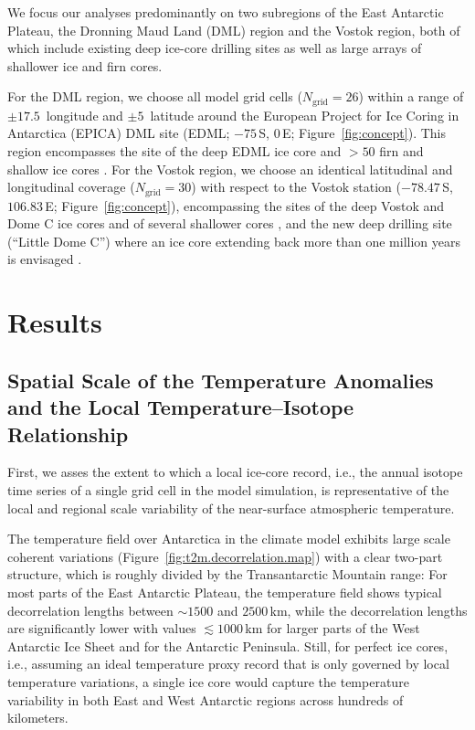\documentclass[draft]{agujournal2019}
\begin{document}
We focus our analyses predominantly on two subregions of the East Antarctic
Plateau, the Dronning Maud Land (DML) region and the Vostok region, both of
which include existing deep ice-core drilling sites as well as large arrays of
shallower ice and firn cores.

For the DML region, we choose all model grid cells ($N_{\mathrm{grid}}=26$)
within a range of $\pm17.5$\textdegree\ longitude and $\pm5$\textdegree\
latitude around the European Project for Ice Coring in Antarctica (EPICA) DML
site (EDML; $-75$\textdegree\,S, $0$\textdegree\,E;
Figure~\ref{fig:concept}). This region encompasses the site of the deep EDML ice
core \cite{EPICAcommunitymembers2006,awi2016} and $>50$ firn and shallow ice
cores \cite{Altnau2015}. For the Vostok region, we choose an identical
latitudinal and longitudinal coverage ($N_{\mathrm{grid}}=30$) with respect to
the Vostok station ($-78.47$\textdegree\,S, $106.83$\textdegree\,E;
Figure~\ref{fig:concept}), encompassing the sites of the deep Vostok and Dome C
ice cores and of several shallower cores \cite{Stenni2017}, and the new deep
drilling site (``Little Dome C'') where an ice core extending back more than one
million years is envisaged \cite{Passalacqua2018}.

\section{Results}\label{results}

\subsection{Spatial Scale of the Temperature Anomalies and the Local
  Temperature--Isotope Relationship}
\label{results:t2m-iso}

First, we asses the extent to which a local ice-core record, i.e., the annual
isotope time series of a single grid cell in the model simulation, is
representative of the local and regional scale variability of the near-surface
atmospheric temperature.

The temperature field over Antarctica in the climate model exhibits large scale
coherent variations (Figure~\ref{fig:t2m.decorrelation.map}) with a clear two-part
structure, which is roughly divided by the Transantarctic Mountain range: For
most parts of the East Antarctic Plateau, the temperature field shows typical
decorrelation lengths between $\sim1500$ and $2500$\,km, while the decorrelation
lengths are significantly lower with values $\lesssim1000$\,km for larger parts
of the West Antarctic Ice Sheet and for the Antarctic Peninsula.  Still, for
perfect ice cores, i.e., assuming an ideal temperature proxy record that is only
governed by local temperature variations, a single ice core would capture the
temperature variability in both East and West Antarctic regions across hundreds
of kilometers.
\end{document}
